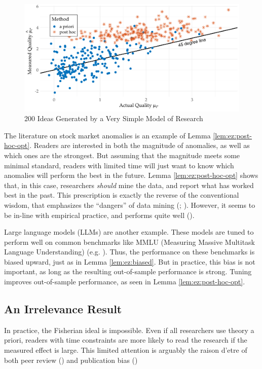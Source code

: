 \documentclass[12pt,english]{article}
\theoremstyle{plain}
\theoremstyle{plain}
\begin{document}
\begin{figure}[htbp]
    \centering
    \includegraphics[width=\textwidth]{exhibits/simple-scatter.pdf}
    \caption{200 Ideas Generated by a Very Simple Model of Research}
    \label{fig:ez}
\end{figure}


The literature on stock market anomalies is an example of Lemma \ref{lem:ez:post-hoc-opt}. Readers are interested in both the magnitude of anomalies, as well as which ones are the strongest.  But assuming that the magnitude meets some minimal standard, readers with limited time will just want to know which anomalies will perform the best in the future. Lemma \ref{lem:ez:post-hoc-opt} shows that, in this case, researchers \emph{should} mine the data, and report what has worked best in the past. This prescription is exactly the reverse of the conventional wisdom, that emphasizes the ``dangers'' of data mining (\citealt{sullivan1999data}; \citealt{harvey2016and}). However, it seems to be in-line with empirical practice, and performs quite well (\citealt{chen2024does}).

Large language models (LLMs) are another example. These models are tuned to perform well on common benchmarks like MMLU (Measuring Massive Multitask Language Understanding) (e.g. \citet{guo2025deepseek}). Thus, the performance on these benchmarks is biased upward, just as in Lemma \ref{lem:ez:biased}. But in practice, this bias is not important, as long as the resulting out-of-sample performance is strong. Tuning improves out-of-sample performance, as seen in Lemma \ref{lem:ez:post-hoc-opt}. 

\subsection{An Irrelevance Result}\label{sec:ez:irr}

In practice, the Fisherian ideal is impossible. Even if all researchers use theory a priori, readers with time constraints are more likely to read the research if the measured effect is large.  This limited attention is arguably the raison d'etre of both peer review (\citet{klamer2002attention}) and publication bias (\citet{chen2022publication})
\end{document}
